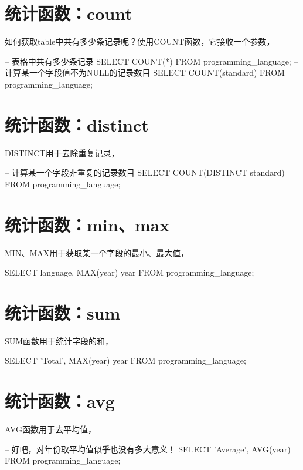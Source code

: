 \documentclass[a4paper,11pt]{article}
\begin{document}
\section[统计函数：count]{统计函数：count}
如何获取table中共有多少条记录呢？使用COUNT函数，它接收一个参数，

\begin{sqlcode}
-- 表格中共有多少条记录
SELECT COUNT(*) FROM programming_language;
-- 计算某一个字段值不为NULL的记录数目
SELECT COUNT(standard) FROM programming_language;
\end{sqlcode}

\section[统计函数：distinct]{统计函数：distinct}
DISTINCT用于去除重复记录，

\begin{sqlcode}
-- 计算某一个字段非重复的记录数目
SELECT COUNT(DISTINCT standard) FROM programming_language;
\end{sqlcode}

\section[统计函数：min、max]{统计函数：min、max}
MIN、MAX用于获取某一个字段的最小、最大值，

\begin{sqlcode}
SELECT language, MAX(year) year FROM programming_language;
\end{sqlcode}

\section[统计函数：sum]{统计函数：sum}
SUM函数用于统计字段的和，

\begin{sqlcode}
SELECT 'Total', MAX(year) year FROM programming_language;
\end{sqlcode}

\section[统计函数：avg]{统计函数：avg}
AVG函数用于去平均值，

\begin{sqlcode}
-- 好吧，对年份取平均值似乎也没有多大意义！
SELECT 'Average', AVG(year) FROM programming_language;
\end{sqlcode}
\end{document}
